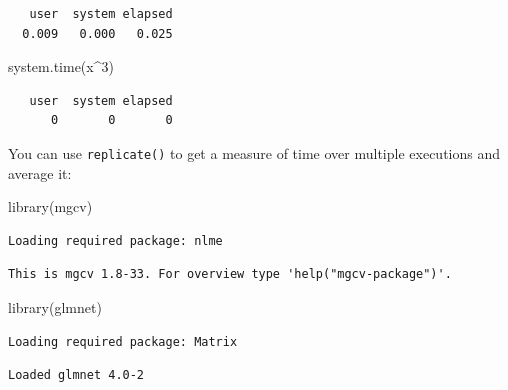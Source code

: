 \documentclass[
]{book}
\newenvironment{Shaded}{\begin{snugshade}}{\end{snugshade}}
\newcommand{\DecValTok}[1]{\textcolor[rgb]{0.00,0.00,0.81}{#1}}
\newcommand{\FunctionTok}[1]{\textcolor[rgb]{0.00,0.00,0.00}{#1}}
\newcommand{\NormalTok}[1]{#1}
\newcommand{\SpecialCharTok}[1]{\textcolor[rgb]{0.00,0.00,0.00}{#1}}
\begin{document}
\begin{verbatim}
   user  system elapsed 
  0.009   0.000   0.025 
\end{verbatim}

\begin{Shaded}
\begin{Highlighting}[]
\FunctionTok{system.time}\NormalTok{(x}\SpecialCharTok{\^{}}\DecValTok{3}\NormalTok{)}
\end{Highlighting}
\end{Shaded}

\begin{verbatim}
   user  system elapsed 
      0       0       0 
\end{verbatim}

You can use \texttt{replicate()} to get a measure of time over multiple executions and average it:

\begin{Shaded}
\begin{Highlighting}[]
\FunctionTok{library}\NormalTok{(mgcv)}
\end{Highlighting}
\end{Shaded}

\begin{verbatim}
Loading required package: nlme
\end{verbatim}

\begin{verbatim}
This is mgcv 1.8-33. For overview type 'help("mgcv-package")'.
\end{verbatim}

\begin{Shaded}
\begin{Highlighting}[]
\FunctionTok{library}\NormalTok{(glmnet)}
\end{Highlighting}
\end{Shaded}

\begin{verbatim}
Loading required package: Matrix
\end{verbatim}

\begin{verbatim}
Loaded glmnet 4.0-2
\end{verbatim}
\end{document}
